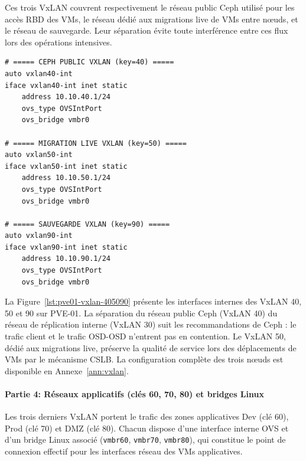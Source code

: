 \par Ces trois VxLAN couvrent respectivement le réseau public Ceph utilisé pour les accès RBD des VMs, le réseau dédié aux migrations live de VMs entre nœuds, et le réseau de sauvegarde. Leur séparation évite toute interférence entre ces flux lors des opérations intensives.\\

\begin{lstlisting}[style=sonacode,language={},caption={Ceph public (clé 40), migration (clé 50) et sauvegarde (clé 90) - interfaces internes PVE-01},label={lst:pve01-vxlan-405090}]
# ===== CEPH PUBLIC VXLAN (key=40) =====
auto vxlan40-int
iface vxlan40-int inet static
    address 10.10.40.1/24
    ovs_type OVSIntPort
    ovs_bridge vmbr0

# ===== MIGRATION LIVE VXLAN (key=50) =====
auto vxlan50-int
iface vxlan50-int inet static
    address 10.10.50.1/24
    ovs_type OVSIntPort
    ovs_bridge vmbr0

# ===== SAUVEGARDE VXLAN (key=90) =====
auto vxlan90-int
iface vxlan90-int inet static
    address 10.10.90.1/24
    ovs_type OVSIntPort
    ovs_bridge vmbr0
\end{lstlisting}

\par La Figure~\ref{lst:pve01-vxlan-405090} présente les interfaces internes des VxLAN 40, 50 et 90 sur PVE-01. La séparation du réseau public Ceph (VxLAN 40) du réseau de réplication interne (VxLAN 30) suit les recommandations de Ceph : le trafic client et le trafic OSD-OSD n'entrent pas en contention. Le VxLAN 50, dédié aux migrations live, préserve la qualité de service lors des déplacements de VMs par le mécanisme CSLB. La configuration complète des trois nœuds est disponible en Annexe~\ref{ann:vxlan}.\\

\paragraph{Partie 4: Réseaux applicatifs (clés 60, 70, 80) et bridges Linux}

\par Les trois derniers VxLAN portent le trafic des zones applicatives Dev (clé 60), Prod (clé 70) et DMZ (clé 80). Chacun dispose d'une interface interne OVS et d'un bridge Linux associé (\texttt{vmbr60}, \texttt{vmbr70}, \texttt{vmbr80}), qui constitue le point de connexion effectif pour les interfaces réseau des VMs applicatives.\\

